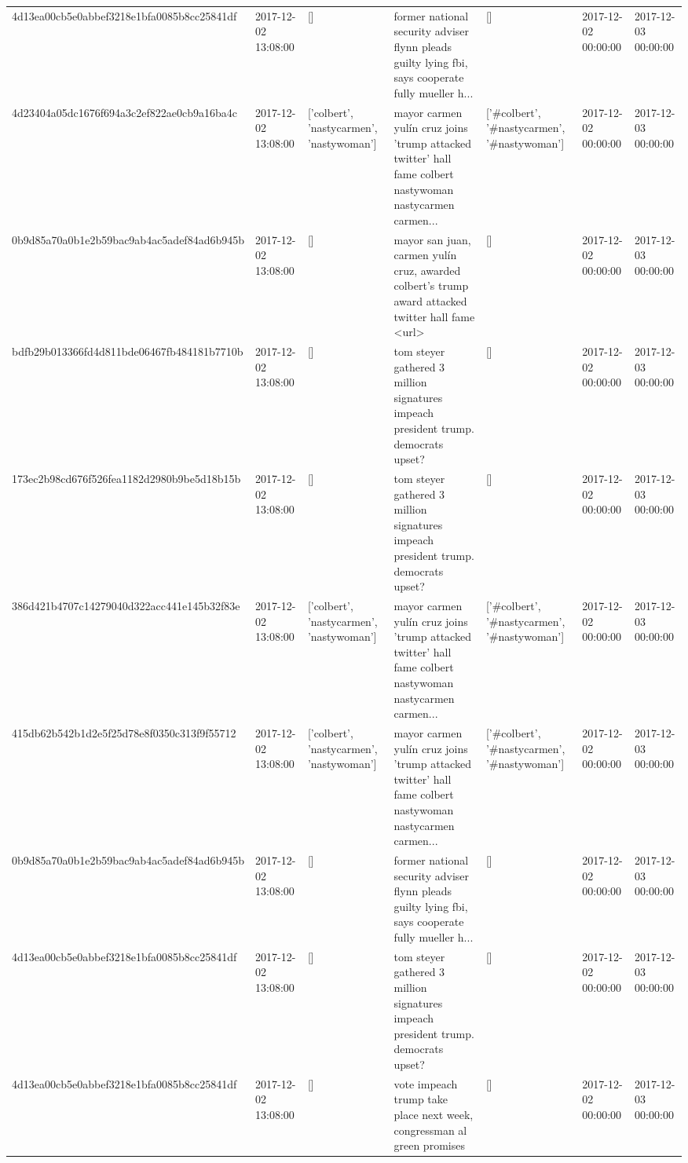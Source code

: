 \begin{tabular}{lllllll}
4d13ea00cb5e0abbef3218e1bfa0085b8cc25841df & 2017-12-02 13:08:00 & [] & former national security adviser flynn pleads guilty lying fbi, says cooperate fully mueller h... & [] & 2017-12-02 00:00:00 & 2017-12-03 00:00:00 \\
4d23404a05dc1676f694a3c2ef822ae0cb9a16ba4c & 2017-12-02 13:08:00 & ['colbert', 'nastycarmen', 'nastywoman'] & mayor carmen yulín cruz joins 'trump attacked twitter' hall fame colbert nastywoman nastycarmen carmen... & ['#colbert', '#nastycarmen', '#nastywoman'] & 2017-12-02 00:00:00 & 2017-12-03 00:00:00 \\
0b9d85a70a0b1e2b59bac9ab4ac5adef84ad6b945b & 2017-12-02 13:08:00 & [] & mayor san juan, carmen yulín cruz, awarded colbert's trump award attacked twitter hall fame <url> & [] & 2017-12-02 00:00:00 & 2017-12-03 00:00:00 \\
bdfb29b013366fd4d811bde06467fb484181b7710b & 2017-12-02 13:08:00 & [] & tom steyer gathered 3 million signatures impeach president trump. democrats upset? & [] & 2017-12-02 00:00:00 & 2017-12-03 00:00:00 \\
173ec2b98cd676f526fea1182d2980b9be5d18b15b & 2017-12-02 13:08:00 & [] & tom steyer gathered 3 million signatures impeach president trump. democrats upset? & [] & 2017-12-02 00:00:00 & 2017-12-03 00:00:00 \\
386d421b4707c14279040d322acc441e145b32f83e & 2017-12-02 13:08:00 & ['colbert', 'nastycarmen', 'nastywoman'] & mayor carmen yulín cruz joins 'trump attacked twitter' hall fame colbert nastywoman nastycarmen carmen... & ['#colbert', '#nastycarmen', '#nastywoman'] & 2017-12-02 00:00:00 & 2017-12-03 00:00:00 \\
415db62b542b1d2e5f25d78e8f0350c313f9f55712 & 2017-12-02 13:08:00 & ['colbert', 'nastycarmen', 'nastywoman'] & mayor carmen yulín cruz joins 'trump attacked twitter' hall fame colbert nastywoman nastycarmen carmen... & ['#colbert', '#nastycarmen', '#nastywoman'] & 2017-12-02 00:00:00 & 2017-12-03 00:00:00 \\
0b9d85a70a0b1e2b59bac9ab4ac5adef84ad6b945b & 2017-12-02 13:08:00 & [] & former national security adviser flynn pleads guilty lying fbi, says cooperate fully mueller h... & [] & 2017-12-02 00:00:00 & 2017-12-03 00:00:00 \\
4d13ea00cb5e0abbef3218e1bfa0085b8cc25841df & 2017-12-02 13:08:00 & [] & tom steyer gathered 3 million signatures impeach president trump. democrats upset? & [] & 2017-12-02 00:00:00 & 2017-12-03 00:00:00 \\
4d13ea00cb5e0abbef3218e1bfa0085b8cc25841df & 2017-12-02 13:08:00 & [] & vote impeach trump take place next week, congressman al green promises & [] & 2017-12-02 00:00:00 & 2017-12-03 00:00:00 \\

\end{tabular}
